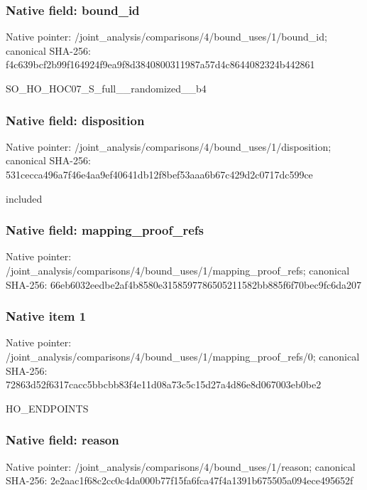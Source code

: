 \documentclass[10pt,a4paper]{article}
\begin{document}
\subsubsection{Native field: bound\_\allowbreak{}id}
Native pointer: /joint\_\allowbreak{}analysis/comparisons/4/bound\_\allowbreak{}uses/1/bound\_\allowbreak{}id; canonical SHA-256: f4c639bcf2b99f164924f9ea9f8d3840800311987a57d4c8644082324b442861

\begingroup\raggedright\sloppy SO\_\allowbreak{}HO\_\allowbreak{}HOC07\_\allowbreak{}S\_\allowbreak{}full\_\allowbreak{}\_\allowbreak{}randomized\_\allowbreak{}\_\allowbreak{}b4\par\endgroup

\subsubsection{Native field: disposition}
Native pointer: /joint\_\allowbreak{}analysis/comparisons/4/bound\_\allowbreak{}uses/1/disposition; canonical SHA-256: 531cecca496a7f46e4aa9ef40641db12f8bef53aaa6b67c429d2c0717dc599ce

\begingroup\raggedright\sloppy included\par\endgroup

\subsubsection{Native field: mapping\_\allowbreak{}proof\_\allowbreak{}refs}
Native pointer: /joint\_\allowbreak{}analysis/comparisons/4/bound\_\allowbreak{}uses/1/mapping\_\allowbreak{}proof\_\allowbreak{}refs; canonical SHA-256: 66eb6032eedbe2af4b8580e3158597786505211582bb885f6f70bec9fc6da207

\subsubsection{Native item 1}
Native pointer: /joint\_\allowbreak{}analysis/comparisons/4/bound\_\allowbreak{}uses/1/mapping\_\allowbreak{}proof\_\allowbreak{}refs/0; canonical SHA-256: 72863d52f6317cacc5bbcbb83f4e11d08a73c5c15d27a4d86e8d067003eb0be2

\begingroup\raggedright\sloppy HO\_\allowbreak{}ENDPOINTS\par\endgroup

\subsubsection{Native field: reason}
Native pointer: /joint\_\allowbreak{}analysis/comparisons/4/bound\_\allowbreak{}uses/1/reason; canonical SHA-256: 2e2aac1f68c2cc0c4da000b77f15fa6fca47f4a1391b675505a094ece495652f
\end{document}

